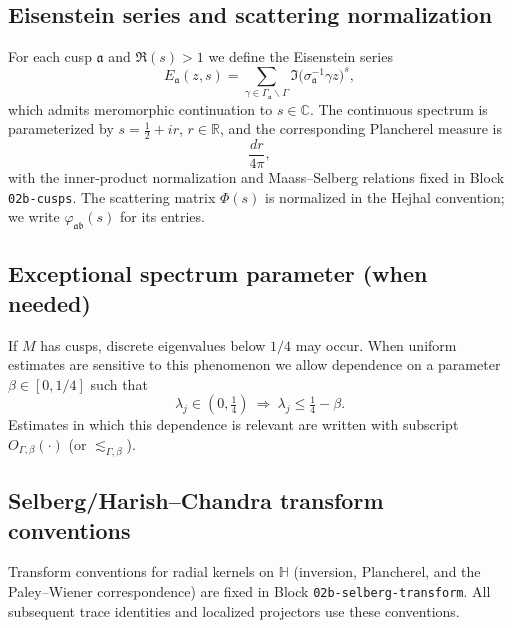 \subsection{Eisenstein series and scattering normalization}\label{subsec:prelim-eisenstein}

For each cusp $\mathfrak a$ and $\Re(s)>1$ we define the Eisenstein series
\[
  E_{\mathfrak a}(z,s)
  =
  \sum_{\gamma\in\Gamma_{\mathfrak a}\backslash\Gamma}
  \Im\big(\sigma_{\mathfrak a}^{-1}\gamma z\big)^{s},
\]
which admits meromorphic continuation to $s\in\mathbb C$.  The continuous spectrum
is parameterized by $s=\tfrac12+ir$, $r\in\mathbb R$, and the corresponding Plancherel
measure is
\[
  \frac{dr}{4\pi},
\]
with the inner-product normalization and Maass--Selberg relations fixed in
Block \texttt{02b-cusps}.  The scattering matrix $\Phi(s)$ is normalized in the
Hejhal convention; we write $\varphi_{\mathfrak a\mathfrak b}(s)$ for its entries.

\subsection{Exceptional spectrum parameter (when needed)}\label{subsec:prelim-exceptional}

If $M$ has cusps, discrete eigenvalues below $1/4$ may occur.  When uniform estimates
are sensitive to this phenomenon we allow dependence on a parameter $\beta\in[0,1/4]$
such that
\[
  \lambda_j\in(0,\tfrac14)
  \ \Longrightarrow\
  \lambda_j\le \tfrac14-\beta.
\]
Estimates in which this dependence is relevant are written with subscript
$O_{\Gamma,\beta}(\cdot)$ (or $\lesssim_{\Gamma,\beta}$).

\subsection{Selberg/Harish--Chandra transform conventions}\label{subsec:prelim-selberg}

Transform conventions for radial kernels on $\mathbb H$ (inversion, Plancherel,
and the Paley--Wiener correspondence) are fixed in Block \texttt{02b-selberg-transform}.
All subsequent trace identities and localized projectors use these conventions.





